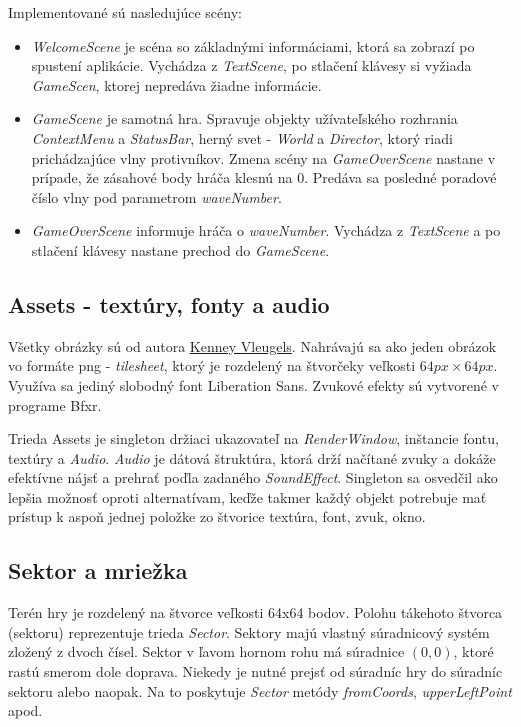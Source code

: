 \documentclass[12pt]{article}
\begin{document}
Implementované sú nasledujúce scény:
\begin{itemize}
    \item \emph{WelcomeScene} je scéna so základnými informáciami, ktorá sa zobrazí
    po spustení aplikácie. Vychádza z \emph{TextScene}, po stlačení klávesy si vyžiada
    \emph{GameScen}, ktorej nepredáva žiadne informácie.
    \item \emph{GameScene} je samotná hra. Spravuje objekty užívateľského rozhrania
    \emph{ContextMenu} a \emph{StatusBar}, herný svet - \emph{World} a \emph{Director},
    ktorý riadi prichádzajúce vlny protivníkov. Zmena scény na \emph{GameOverScene} nastane
    v prípade, že zásahové body hráča klesnú na 0. Predáva sa posledné poradové
    číslo vlny pod parametrom \emph{waveNumber}.
    \item \emph{GameOverScene} informuje hráča o \emph{waveNumber}. Vychádza z \emph{TextScene}
    a po stlačení klávesy nastane prechod do \emph{GameScene}.
\end{itemize}


\subsection{Assets - textúry, fonty a audio}

Všetky obrázky sú od autora \href{https://kenney.nl/}{Kenney Vleugels}. Nahrávajú sa ako jeden obrázok vo formáte png - \emph{tilesheet},
ktorý je rozdelený na štvorčeky veľkosti $64px\times64px$. Využíva sa jediný slobodný font Liberation Sans.
Zvukové efekty sú vytvorené v programe Bfxr.


Trieda Assets je singleton držiaci ukazovateľ na \emph{RenderWindow}, inštancie fontu, textúry a \emph{Audio}.
\emph{Audio} je dátová štruktúra, ktorá drží načítané zvuky a dokáže efektívne nájsť a prehrať poďla zadaného 
\emph{SoundEffect}. Singleton sa osvedčil ako lepšia možnosť oproti alternatívam, keďže takmer každý objekt potrebuje
mať prístup k aspoň jednej položke zo štvorice textúra, font, zvuk, okno.

\subsection{Sektor a mriežka}

Terén hry je rozdelený na štvorce veľkosti 64x64 bodov. Polohu tákehoto štvorca (sektoru) reprezentuje trieda
\emph{Sector}. Sektory majú vlastný súradnicový systém zložený z dvoch čísel. Sektor v ľavom hornom rohu má súradnice
$(0, 0)$, ktoré rastú smerom dole doprava. Niekedy je nutné prejsť od súradníc hry do súradníc sektoru alebo naopak.
Na to poskytuje \emph{Sector} metódy \emph{fromCoords}, \emph{upperLeftPoint} apod.
\end{document}
